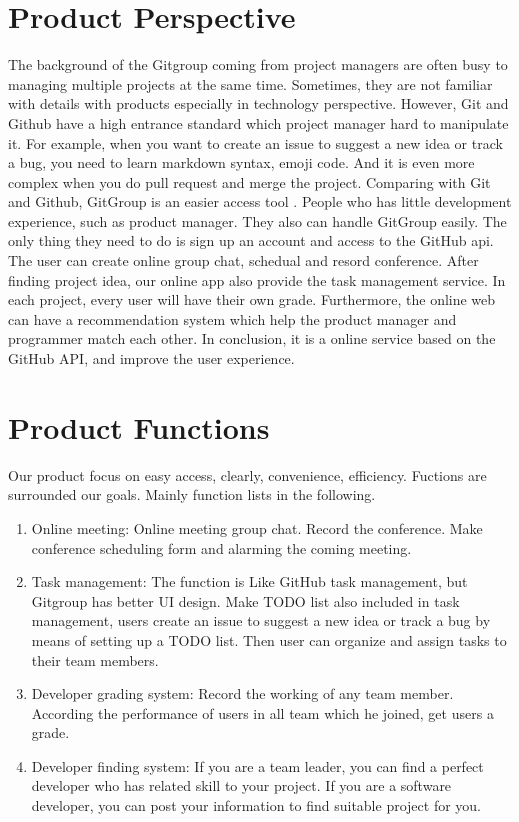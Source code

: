 \documentclass[12pt,a4paper]{report}
\begin{document}
\section{Product Perspective}
The background of the Gitgroup coming from project managers are often busy to managing multiple projects at the same time. Sometimes, they are not familiar with details with products especially in technology perspective. However, Git and Github have a high entrance standard which project manager hard to manipulate it. For example, when you want to create an issue to suggest a new idea or track a bug, you need to learn markdown syntax, emoji code. And it is even more complex when you do pull request and merge the project. Comparing with Git and Github,   GitGroup is an easier access tool . People who has little development experience, such as product manager. They also can handle GitGroup easily. The only thing they need to do is sign up an account and access to the GitHub api. The user can create online group chat, schedual and resord conference. After finding project idea, our online app also provide the task management service. In each project, every user will have their own grade. Furthermore, the online web can have a recommendation system which help the product manager and programmer match each other. In conclusion, it is a online service based on the GitHub API, and improve the user experience. 
\section{Product Functions}
Our product focus on easy access, clearly, convenience, efficiency. Fuctions are surrounded our goals. Mainly function lists in the following.
\begin{enumerate}
	\renewcommand{\labelenumi}{{\textbf{\arabic{enumi}.}}}
	\item Online meeting: Online meeting group chat. Record the conference. Make conference scheduling form and alarming the coming meeting. 
	\item Task management: The function is Like GitHub task management, but Gitgroup has better UI design. Make TODO list also included in task management, users create an issue to suggest a new idea or track a bug by means of setting up a TODO list. Then user can organize and assign tasks to their team members. 
	\item Developer grading system: Record the working of any team member. According the performance of users in all team which he joined, get users a grade.
	\item Developer finding system: If you are a team leader, you can find a perfect developer who has related skill to your project. If you are a software developer, you can post your information to find suitable project for you.
\end{enumerate}
\end{document}
